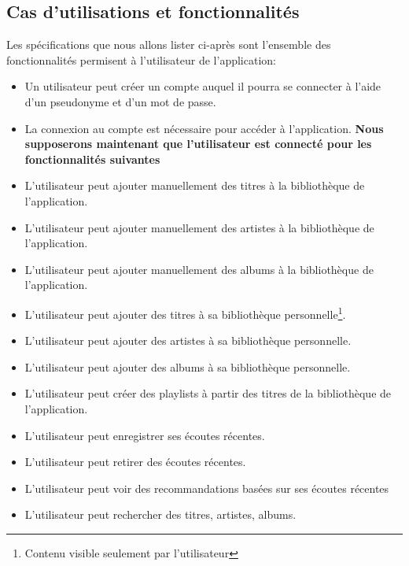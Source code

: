 \documentclass[a4paper,12pt, french]{report}
\begin{document}
  \subsection{Cas d'utilisations et fonctionnalités}
    Les spécifications que nous allons lister ci-après sont l'ensemble des fonctionnalités permisent à l'utilisateur de l'application:
    \begin{itemize}
      \item Un utilisateur peut créer un compte auquel il pourra se connecter à l'aide d'un pseudonyme et d'un mot de passe.
      \item La connexion au compte est nécessaire pour accéder à l'application. \newline
        \textbf{Nous supposerons maintenant que l'utilisateur est connecté pour les fonctionnalités suivantes}
      \item L'utilisateur peut ajouter manuellement des titres à la bibliothèque de l'application.
      \item L'utilisateur peut ajouter manuellement des artistes à la bibliothèque de l'application.
      \item L'utilisateur peut ajouter manuellement des albums à la bibliothèque de l'application.
      \item L'utilisateur peut ajouter des titres à sa bibliothèque personnelle\footnote{Contenu visible seulement par l'utilisateur}.
      \item L'utilisateur peut ajouter des artistes à sa bibliothèque personnelle.
      \item L'utilisateur peut ajouter des albums à sa bibliothèque personnelle.
      \item L'utilisateur peut créer des playlists à partir des titres de la bibliothèque de l'application.
      \item L'utilisateur peut enregistrer ses écoutes récentes.
      \item L'utilisateur peut retirer des écoutes récentes.
      \item L'utilisateur peut voir des recommandations basées sur ses écoutes récentes
      \item L'utilisateur peut rechercher des titres, artistes, albums.
    \end{itemize}
\end{document}
